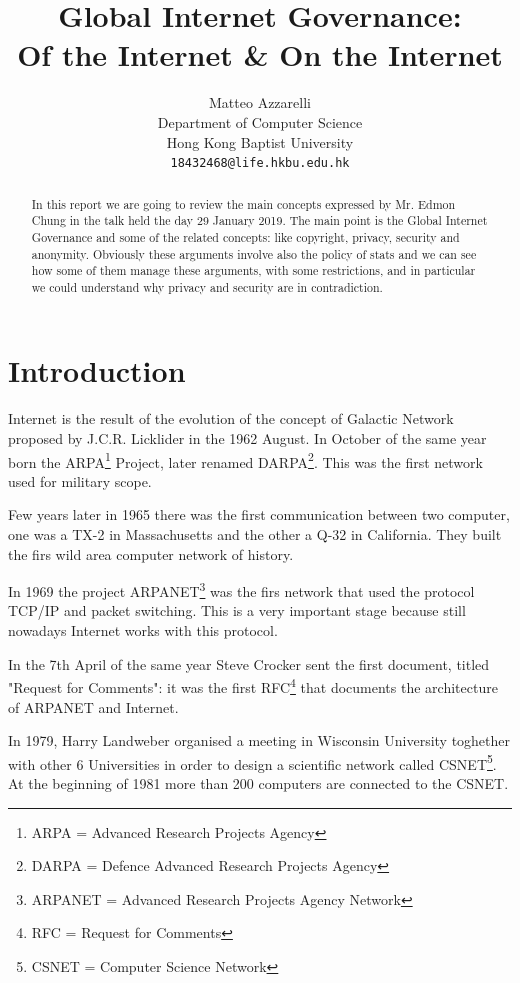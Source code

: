 \documentclass{article}
\title{Global Internet Governance:\\Of the Internet \& On the Internet}
\author{
  Matteo Azzarelli\\
  Department of Computer Science\\
  Hong Kong Baptist University\\
  \texttt{18432468@life.hkbu.edu.hk} \\
}
\begin{document}
\maketitle

\begin{abstract}
    In this report we are going to review the main concepts expressed by Mr. Edmon Chung in the talk held the day 29 January 2019.
    The main point is the Global Internet Governance and some of the related concepts: like copyright, privacy, security and anonymity. Obviously these arguments involve also the policy of stats and we can see how some of them manage these arguments, with some restrictions, and in particular we could understand why privacy and security are in contradiction.
\end{abstract}




\section{Introduction}
    Internet is the result of the evolution of the concept of Galactic Network~\cite{IntergalacticCN} proposed by J.C.R. Licklider in the 1962 August. In October of the same year born the ARPA\footnote{ARPA = Advanced Research Projects Agency} Project, later renamed DARPA\footnote{DARPA = Defence Advanced Research Projects Agency}\cite{DARPA}. This was the first network used for military scope.
    
    Few years later in 1965 there was the first communication between two computer, one was a TX-2 in Massachusetts and the other a Q-32 in California. They built the firs wild area computer network of history.
    
    In 1969 the project ARPANET\footnote{ARPANET = Advanced Research Projects Agency Network}\cite{ARPANET} was the firs network that used the protocol TCP/IP and packet switching. This is a very important stage because still nowadays Internet works with this protocol.
    
    In the 7th April of the same year Steve Crocker sent the first document, titled "Request for Comments": it was the first RFC\footnote{RFC = Request for Comments} that documents the architecture of ARPANET and Internet.
    
    In 1979, Harry Landweber organised a meeting in Wisconsin University toghether with other 6 Universities in order to design a scientific network called CSNET\footnote{CSNET = Computer Science Network}\cite{CSNET}. At the beginning of 1981 more than 200 computers are connected to the CSNET.
    
\end{document}
